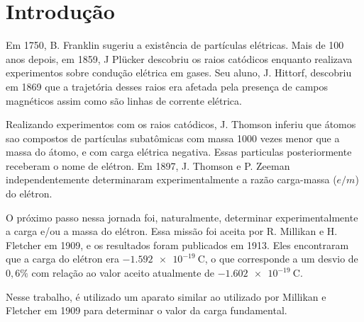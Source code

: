 \section{Introdução}


Em 1750, B. Franklin sugeriu a existência de partículas elétricas. 
Mais de 100 anos depois, em 1859, J Plücker descobriu os raios catódicos enquanto realizava experimentos 
sobre condução elétrica em gases. 
Seu aluno, J. Hittorf, descobriu em 1869 que a trajetória desses raios era afetada pela presença de campos magnéticos
assim como são linhas de corrente elétrica. \cite{cathoderays}

Realizando experimentos com os raios catódicos, J. Thomson inferiu que átomos sao compostos de partículas subatômicas 
com massa 1000 vezes menor que a massa do átomo, e com carga elétrica negativa. 
Essas particulas posteriormente receberam o nome de elétron. 
Em 1897, J. Thomson e P. Zeeman independentemente determinaram experimentalmente a razão carga-massa 
($e/m$) do elétron. \cite{nobelmillikan}

O próximo passo nessa jornada foi, naturalmente, determinar experimentalmente a carga e/ou a massa do elétron. 
Essa missão foi aceita por R. Millikan e H. Fletcher em 1909, e os resultados foram publicados em 1913. 
Eles encontraram que a carga do elétron era $\qty{-1,592e-19}{\coulomb}$, o que corresponde a um desvio de $0,6\%$ 
com relação ao valor aceito atualmente de $\qty{-1,602e-19}{\coulomb}$. \cite{millikan}

Nesse trabalho, é utilizado um aparato similar ao utilizado por Millikan e Fletcher em 1909 para 
determinar o valor da carga fundamental.